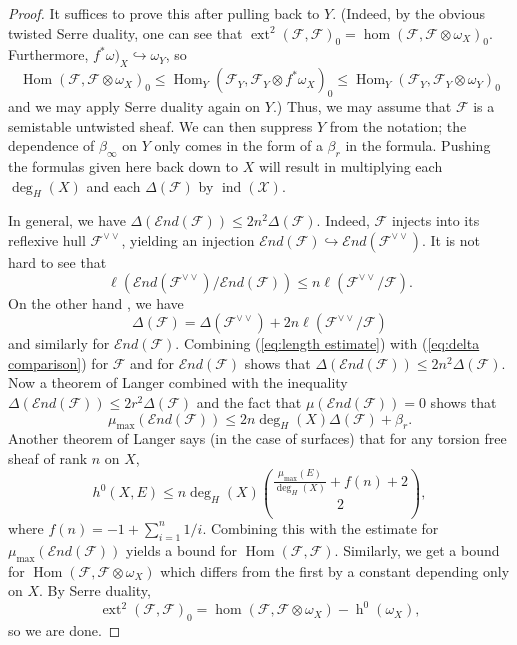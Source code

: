 \documentclass[11pt]{amsart}
\newcommand{\ms}[1]{\mathscr #1}
\renewcommand{\hom}{\operatorname{Hom}}
\newcommand{\send}{\ms E\!nd}
\DeclareMathOperator{\dimhom}{hom}
\DeclareMathOperator{\dimext}{ext}
\DeclareMathOperator{\ind}{ind}
\renewcommand{\[}{[\!\hspace{0.03em}[}
\renewcommand{\]}{]\!\hspace{0.03em}]}
\renewcommand{\(}{(\!\hspace{0.03em}(}
\renewcommand{\)}{)\!\hspace{0.03em})}
\DeclareMathOperator*{\tensor}{\otimes}
\newcommand{\inj}{\hookrightarrow}
\theoremstyle{definition}
\theoremstyle{remark}
\begin{document}
\begin{proof} It suffices to prove this after pulling back to $Y$.  
(Indeed, by the obvious twisted Serre duality, one can see that 
$\dimext^{2}(\ms F,\ms F)_{0}=\dimhom(\ms F,\ms 
F\tensor\omega_{X})_{0}$.  Furthermore, 
$f^{\ast}\omega)_{X}\inj\omega_{Y}$, so 
$$\hom(\ms F,\ms F\tensor\omega_{X})_{0}\leq\hom_{Y}(\ms F_{Y},\ms 
F_{Y}\tensor f^{\ast}\omega_{X})_{0}\leq\hom_{Y}(\ms F_{Y},\ms 
F_{Y}\tensor\omega_{Y})_{0}$$
and we may apply Serre duality again on $Y$.)
Thus, we may assume that $\ms F$ is a semistable untwisted sheaf.  We 
can then suppress $Y$ from the notation; the dependence of $\beta_{\infty}$ on $Y$ only comes in the 
form of a $\beta_{r}$ in the formula.  Pushing the formulas given here 
back down to $X$ will result in multiplying each $\deg_{H}(X)$ and 
each $\Delta(\ms F)$ by $\ind(\ms X)$.

In general, we have $\Delta(\send(\ms F))\leq 2n^{2}\Delta(\ms F)$.  
Indeed, $\ms F$ injects into its reflexive hull $\ms F^{\vee\vee}$, 
yielding an injection $\send(\ms F)\inj\send(\ms F^{\vee\vee})$.  It is not hard to see that 
\begin{equation}
    \ell(\send(\ms F^{\vee\vee})/\send(\ms F))\leq n\ell(\ms F^{\vee\vee}/\ms 
    F).      
    \label{eq:length estimate}
\end{equation}
On the other hand \cite[3.4.1]{h-l}, we have 
\begin{equation}
    \Delta(\ms F)=\Delta(\ms F^{\vee\vee})+2n\ell(\ms F^{\vee\vee}/\ms F)    
    \label{eq:delta comparison}
\end{equation}
and similarly for $\send(\ms F)$.  Combining (\ref{eq:length estimate}) 
with (\ref{eq:delta comparison}) for $\ms F$ and for $\send(\ms F)$ 
shows that $\Delta(\send(\ms F))\leq 2n^{2}\Delta(\ms F)$.  Now
a theorem of Langer \cite[5.1]{langer} 
combined with the inequality $\Delta(\send(\ms F))\leq 2r^{2}\Delta(\ms 
F)$ and the fact that $\mu(\send(\ms F))=0$ shows that 
$$\mu_{\text{max}}(\send(\ms F))\leq 2n\deg_{H}(X)\Delta(\ms 
F)+\beta_{r}.$$  Another theorem of Langer \cite[3.3]{langer-moduli} says 
(in the case of surfaces) 
that for any torsion free sheaf of rank $n$ on $X$,
$$h^{0}(X,E)\leq 
n\deg_{H}(X)\binom{\frac{\mu_{\text{max}}(E)}{\deg_{H}(X)}+f(n)+2}{2},$$
where $f(n)=-1+\sum_{i=1}^{n}1/i$.  Combining this with the estimate 
for $\mu_{\text{max}}(\send(\ms F))$ yields a bound for $\hom(\ms 
F,\ms F)$.  Similarly, we get a bound for $\hom(\ms F,\ms 
F\tensor\omega_{X})$ which differs from the first by a constant depending 
only on $X$.  By Serre duality, $$\dimext^{2}(\ms F,\ms F)_{0}=\dimhom(\ms F,\ms 
F\tensor\omega_{X})-\operatorname{h}^{0}(\omega_{X}),$$ 
so we are done.
\end{proof}
\end{document}
